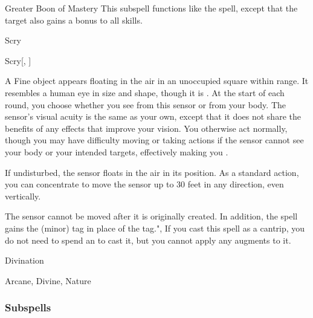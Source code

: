 \begin{ability}[\nth{7}]{Greater Boon of Mastery}
This subspell functions like the  spell, except that the target also gains a  bonus to all skills.
\end{ability}
\vspace{0.25em}

\newpage
\begin{spellsection}{Scry}

\begin{spellheader}
\end{spellheader}


\begin{ability}{Scry}[, ]

A Fine object appears floating in the air in an unoccupied square within \rngmed range.
It resembles a human eye in size and shape, though it is .
At the start of each round, you choose whether you see from this sensor or from your body.
The sensor's visual acuity is the same as your own, except that it does not share the benefits of any  effects that improve your vision.
You otherwise act normally, though you may have difficulty moving or taking actions if the sensor cannot see your body or your intended targets, effectively making you \blinded.

If undisturbed, the sensor floats in the air in its position.
As a standard action, you can concentrate to move the sensor up to 30 feet in any direction, even vertically.

\end{ability}



The sensor cannot be moved after it is originally created.
In addition, the spell gains the  (minor) tag in place of the  tag.",
If you cast this spell as a cantrip,
you do not need to spend an  to cast it,
but you cannot apply any augments to it.


 Divination

 Arcane, Divine, Nature
\end{spellsection}


\subsubsection{Subspells}


